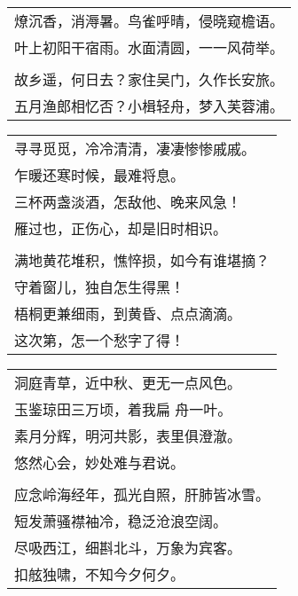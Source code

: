 \noindent\begin{minipage}{\linewidth}
  \vskip-3pt\begin{table}[H]
    \centering
    \begin{tabular}{@{}l@{}}
燎沉香，消溽暑。鸟雀呼晴，侵晓窥檐语。\\
叶上初阳干宿雨。水面清圆，一一风荷举。\\
\\
故乡遥，何日去？家住吴门，久作长安旅。\\
五月渔郎相忆否？小楫轻舟，梦入芙蓉浦。
    \end{tabular}
  \end{table}
\end{minipage}
\vspace{1cm}


\noindent\begin{minipage}{\linewidth}
  \vskip-3pt\begin{table}[H]
    \centering
    \begin{tabular}{@{}l@{}}
寻寻觅觅，冷冷清清，凄凄惨惨戚戚。\\
乍暖还寒时候，最难将息。\\
三杯两盏淡酒，怎敌他、晚来风急！\\
雁过也，正伤心，却是旧时相识。\\
\\
满地黄花堆积，憔悴损，如今有谁堪摘？\\
守着窗儿，独自怎生得黑！\\
梧桐更兼细雨，到黄昏、点点滴滴。\\
这次第，怎一个愁字了得！
    \end{tabular}
  \end{table}
\end{minipage}
\vspace{1cm}


\noindent\begin{minipage}{\linewidth}
  \vskip-3pt\begin{table}[H]
    \centering
    \begin{tabular}{@{}l@{}}
洞庭青草，近中秋、更无一点风色。\\
玉鉴琼田三万顷，着我扁 舟一叶。\\
素月分辉，明河共影，表里俱澄澈。\\
悠然心会，妙处难与君说。\\
\\
应念岭海经年，孤光自照，肝肺皆冰雪。\\
短发萧骚襟袖冷，稳泛沧浪空阔。\\
尽吸西江，细斟北斗，万象为宾客。\\
扣舷独啸，不知今夕何夕。
    \end{tabular}
  \end{table}
\end{minipage}
\vspace{1cm}


